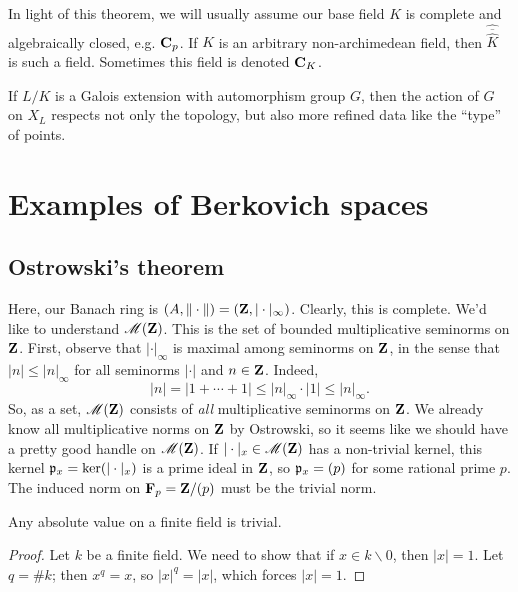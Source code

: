 In light of this theorem, we will usually assume our base field $K$ is 
complete and algebraically closed, e.g. $\mathbf{C}_p$. If $K$ is an arbitrary 
non-archimedean field, then $\widehat{\overline{\widehat K}}$ is such a field. 
Sometimes this field is denoted $\mathbf{C}_K$. 

If $L/K$ is a Galois extension with automorphism group $G$, then the action of 
$G$ on $X_L$ respects not only the topology, but also more refined data like 
the ``type'' of points. 





\section{Examples of Berkovich spaces}





\subsection{Ostrowski's theorem}

Here, our Banach ring is $(A,\|\cdot\|) = (\mathbf{Z},|\cdot|_\infty)$. Clearly, this 
is complete. We'd like to understand $\operatorname{\mathscr{M}}(\mathbf{Z})$. This is the set of 
bounded multiplicative seminorms on $\mathbf{Z}$. First, observe that $|\cdot|_\infty$ 
is maximal among seminorms on $\mathbf{Z}$, in the sense that 
$|n|\leqslant |n|_\infty$ for all seminorms $|\cdot|$ and $n\in \mathbf{Z}$. Indeed, 
\[
	|n| = |1+\cdots + 1| \leqslant |n|_\infty\cdot |1| \leqslant |n|_\infty .
\]
So, as a set, $\operatorname{\mathscr{M}}(\mathbf{Z})$ consists of \emph{all} multiplicative seminorms 
on $\mathbf{Z}$. We already know all multiplicative norms on $\mathbf{Z}$ by Ostrowski, 
so it seems like we should have a pretty good handle on $\operatorname{\mathscr{M}}(\mathbf{Z})$. If 
$|\cdot|_x\in \operatorname{\mathscr{M}}(\mathbf{Z})$ has a non-trivial kernel, this kernel 
$\mathfrak{p}_x=\ker(|\cdot|_x)$ is a prime ideal in $\mathbf{Z}$, so $\mathfrak{p}_x=(p)$ for some 
rational prime $p$. The induced norm on $\mathbf{F}_p = \mathbf{Z}/(p)$ must be the trivial 
norm. 

\begin{theorem}
Any absolute value on a finite field is trivial. 
\end{theorem}
\begin{proof}
Let $k$ be a finite field. We need to show that if $x\in k\smallsetminus 0$, 
then $|x|=1$. Let $q=\# k$; then $x^q=x$, so $|x|^q=|x|$, which forces 
$|x|=1$. 
\end{proof}


